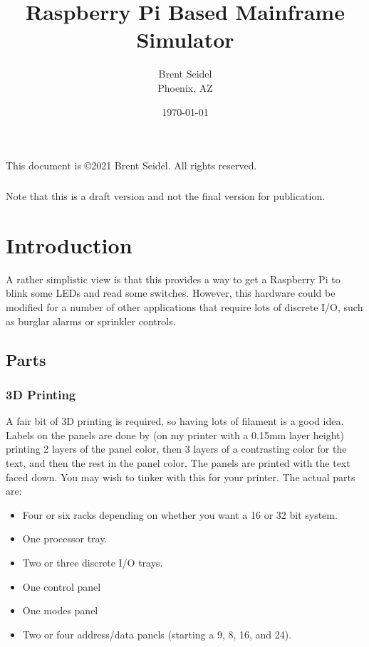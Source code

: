 \documentclass[10pt, openany]{book}
\title{Raspberry Pi Based Mainframe Simulator}
\author{Brent Seidel \\ Phoenix, AZ}
\date{ \today }
\begin{document}
%
%
\frontmatter
\maketitle
\begin{center}
This document is \copyright 2021 Brent Seidel.  All rights reserved.

\paragraph{}Note that this is a draft version and not the final version for publication.
\end{center}
\tableofcontents

\mainmatter
\chapter{Introduction}
A rather simplistic view is that this provides a way to get a Raspberry Pi to blink some LEDs and read some switches.  However, this hardware could be modified for a number of other applications that require lots of discrete I/O, such as burglar alarms or sprinkler controls.

\section{Parts}
\subsection{3D Printing}
A fair bit of 3D printing is required, so having lots of filament is a good idea.  Labels on the panels are done by (on my printer with a 0.15mm layer height) printing 2 layers of the panel color, then 3 layers of a contrasting color for the text, and then the rest in the panel color.  The panels are printed with the text faced down.  You may wish to tinker with this for your printer.  The actual parts are:
\begin{itemize}
  \item Four or six racks depending on whether you want a 16 or 32 bit system.
  \item One processor tray.
  \item Two or three discrete I/O trays.
  \item One control panel
  \item One modes panel
  \item Two or four address/data panels (starting a 9, 8, 16, and 24).
\end{itemize}
\end{document}

